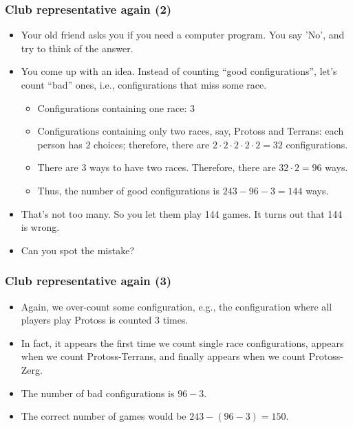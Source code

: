 \begin{frame}\frametitle{Club representative again (2)}
  \begin{itemize}
  \item Your old friend asks you if you need a computer program.  You
    say 'No', and try to think of the answer.
    \pause
  \item You come up with an idea.  Instead of counting ``good
    configurations'', let's count ``bad'' ones, i.e., configurations
    that miss some race.
    \pause
    \begin{itemize}
    \item Configurations containing one race: $3$
      \pause
    \item Configurations containing only two races, say, Protoss and
      Terrans: each person has 2 choices; therefore, there are $2\cdot
      2\cdot 2\cdot 2\cdot 2 = 32$ configurations.
      \pause
    \item There are 3 ways to have two races.  Therefore, there are
      $32\cdot 2 = 96$ ways.
      \pause
    \item Thus, the number of good configurations is $243 - 96 - 3 =
      144$ ways.
    \end{itemize}
    \pause
  \item That's not too many.  So you let them play 144 games.  \pause
    It turns out that 144 is wrong.
  \item Can you spot the mistake?
  \end{itemize}
\end{frame}

\begin{frame}\frametitle{Club representative again (3)}
  \begin{itemize}
  \item Again, we over-count some configuration,  \pause e.g., the
    configuration where all players play Protoss is counted 3 times.
    \pause
  \item In fact, it appears the first time we count single race
    configurations, appears when we count Protoss-Terrans, and finally
    appears when we count Protoss-Zerg.
    \pause
  \item The number of bad configurations is $96 - 3$. \pause
  \item The correct number of games would be $243 - (96 - 3) = 150$.
  \end{itemize}
\end{frame}

